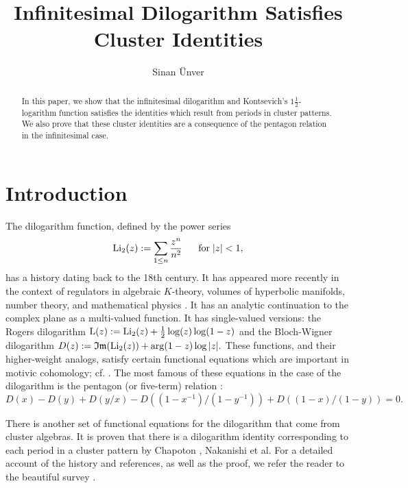 \documentclass{amsart}
\title{ I\MakeLowercase{nfinitesimal} D\MakeLowercase{ilogarithm} S\MakeLowercase{atisfies} C\MakeLowercase{luster} I\MakeLowercase{dentities}}
\author{S\MakeLowercase{inan} \"{U}\MakeLowercase{nver}}
\theoremstyle{definition}
\numberwithin{equation}{subsection}
\begin{document}
\maketitle
\noindent


\begin{abstract}
In this paper, we show that the infinitesimal dilogarithm and Kontsevich's $1\frac{1}{2}$-logarithm function satisfies the identities which result from periods in cluster patterns. We also prove that these cluster identities are a consequence of the pentagon relation in the infinitesimal case.
\end{abstract}


\section{Introduction} 

The dilogarithm function, defined by the power series 
$$
{\rm Li}_{2}(z):=\sum _{1\leq n}\frac{z^n}{n^2}\;\;\;\;\;\; {\rm for }\; |z|<1,
$$
has a  history dating back to the 18th century. It has appeared more recently in the context of regulators in algebraic $K$-theory, volumes of hyperbolic manifolds, number theory, and mathematical physics \cite{zag}. It has an analytic continuation to the complex plane as a multi-valued function. It has single-valued versions: the Rogers dilogarithm ${\rm L}(z):={\rm Li}_{2}(z)+\frac{1}{2}\log(z)\log (1-z)$ and the Bloch-Wigner dilogarithm $D(z):=\mathfrak{Im}({\rm Li}_{2}(z))+\arg(1-z)\log|z|.$ These functions, and their higher-weight analogs, satisfy certain functional equations which are important in motivic cohomology; cf. \cite{geo}. The most famous of these equations in the case of the dilogarithm is the pentagon (or five-term) relation \cite{zag}: 
$$
D(x)-D(y)+D(y/x)-D((1-x^{-1})/(1-y^{-1}))+D((1-x)/(1-y))=0.
$$

There is another set of functional equations for the dilogarithm that come from cluster algebras. It is proven that there is a dilogarithm identity corresponding to each period in a cluster pattern by Chapoton \cite{cha}, Nakanishi \cite{nak-id} et al. For a detailed account of the history and references, as well as the proof, we refer the reader to the beautiful survey \cite{nak}.
\end{document}
